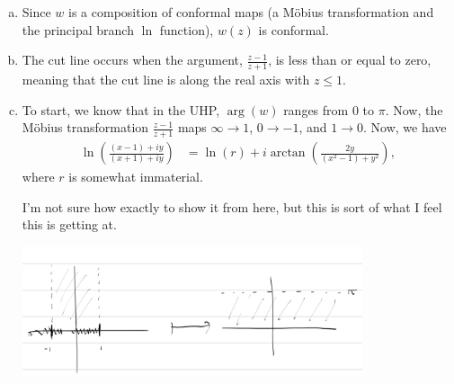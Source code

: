 \documentclass[10pt]{mypackage}
\begin{document}
\begin{solution}[20.11]\hfill
  \begin{enumerate}[(a)]
    \item Since $w$ is a composition of conformal maps (a Möbius transformation and the principal branch $\ln$ function), $w(z)$ is conformal.
    \item The cut line occurs when the argument, $\frac{z-1}{z+1}$, is less than or equal to zero, meaning that the cut line is along the real axis with $z \leq 1$.
    \item To start, we know that in the UHP, $\arg(w)$ ranges from $0$ to $\pi$. Now, the Möbius transformation $\frac{z-1}{z+1}$ maps $\infty \rightarrow 1$, $0\rightarrow -1$, and $1 \rightarrow 0$. Now, we have
      \begin{align*}
        \ln\left( \frac{\left( x-1 \right) + iy}{\left( x+1 \right) + iy} \right) &= \ln \left( r \right) + i \arctan \left( \frac{2y}{\left( x^2 -1 \right) + y^2} \right),
      \end{align*}
      where $r$ is somewhat immaterial.\newline

      I'm not sure how exactly to show it from here, but this is sort of what I feel this is getting at.
      \begin{center}
        \includegraphics[width=10cm]{images/20_11_c.png}
      \end{center}
  \end{enumerate}
\end{solution}
\end{document}
